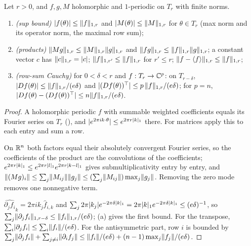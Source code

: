 \begin{lemma}\label{bp:p2s2l1:toolkit}
Let $r>0$, and $f,g,M$ holomorphic and $1$-periodic on $T_r$ with finite norms.
\begin{enumerate}[label=(\alph*)]
\item \emph{(sup bound)} $\lvert f(\theta)\rvert\le\lVert f\rVert_{1,r}$ and $\lvert M(\theta)\rvert\le\lVert M\rVert_{1,r}$ for $\theta\in T_r$ (max norm and its operator
  norm, the maximal row sum);
\item \emph{(products)} $\lVert Mg\rVert_{1,r}\le\lVert M\rVert_{1,r}\lVert g\rVert_{1,r}$ and $\lVert fg\rVert_{1,r}\le\lVert f\rVert_{1,r}\lVert g\rVert_{1,r}$; a constant
  vector $c$ has $\lVert c\rVert_{1,r}=\lvert c\rvert$; $\lVert f\rVert_{1,r'}\le\lVert f\rVert_{1,r}$ for $r'\le r$; $\lVert f-\langle f\rangle\rVert_{1,r}\le\lVert f\rVert_{1,r}$;
\item \emph{(row-sum Cauchy)} for $0<\delta<r$ and $f:T_r\to\mathbb{C}^p$: on $T_{r-\delta}$, $\lvert Df(\theta)\rvert\le\lVert f\rVert_{1,r}/(e\delta)$ and
  $\lvert (Df(\theta))^\top\rvert\le p\,\lVert f\rVert_{1,r}/(e\delta)$; for $p=n$, $\lvert Df(\theta)-(Df(\theta))^\top\rvert\le n\lVert f\rVert_{1,r}/(e\delta)$.
\end{enumerate}
\end{lemma}

\begin{proof}
\label{step:p2s2l1:tk-sup}
A holomorphic periodic $f$ with summable weighted coefficients equals its Fourier series on $T_r$ (),
and $\lvert e^{2\pi ik\cdot\theta}\rvert\le e^{2\pi r\lvert k\rvert_1}$ there. For matrices apply this to each entry and sum a row.

\label{step:p2s2l1:tk-prod}
On $\mathbb{R}^n$ both factors equal their absolutely convergent Fourier series, so the coefficients of the product are the convolutions of the
coefficients; $e^{2\pi r\lvert k\rvert_1}\le e^{2\pi r\lvert l\rvert_1}e^{2\pi r\lvert k-l\rvert_1}$ gives submultiplicativity entry by entry, and
$\lVert (Mg)_i\rVert\le\sum_j\lVert M_{ij}\rVert\lVert g_j\rVert\le(\sum_j\lVert M_{ij}\rVert)\max_j\lVert g_j\rVert$. Removing the zero mode removes one nonnegative
term.

\label{step:p2s2l1:tk-cauchy}
$\widehat{\partial_jf_i}_k=2\pi ik_j\hat f_{i,k}$ and $\sum_j2\pi\lvert k_j\rvert e^{-2\pi\delta\lvert k\rvert_1}=2\pi\lvert k\rvert_1e^{-2\pi\delta\lvert k\rvert_1}\le(e\delta)^{-1}$,
so $\sum_j\lVert \partial_jf_i\rVert_{1,r-\delta}\le\lVert f_i\rVert_{1,r}/(e\delta)$; (a) gives the first bound. For the transpose,
$\sum_i\lvert \partial_jf_i\rvert\le\sum_i\lVert f_i\rVert/(e\delta)$. For the antisymmetric part, row $i$ is bounded by
$\sum_j\lVert \partial_jf_i\rVert+\sum_{j\ne i}\lVert \partial_if_j\rVert\le\lVert f_i\rVert/(e\delta)+(n-1)\max_j\lVert f_j\rVert/(e\delta)$.
\end{proof}

